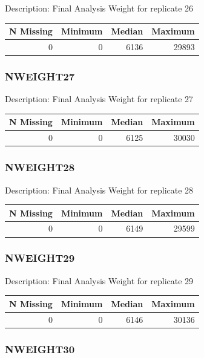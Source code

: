 \documentclass[
]{krantz}
\begin{document}
Description: Final Analysis Weight for replicate 26

\begin{tabular}[t]{r|r|r|r}
\hline
N Missing & Minimum & Median & Maximum\\
\hline
0 & 0 & 6136 & 29893\\
\hline
\end{tabular}

\hypertarget{nweight27}{%
\subsubsection*{NWEIGHT27}\label{nweight27}}


Description: Final Analysis Weight for replicate 27

\begin{tabular}[t]{r|r|r|r}
\hline
N Missing & Minimum & Median & Maximum\\
\hline
0 & 0 & 6125 & 30030\\
\hline
\end{tabular}

\hypertarget{nweight28}{%
\subsubsection*{NWEIGHT28}\label{nweight28}}


Description: Final Analysis Weight for replicate 28

\begin{tabular}[t]{r|r|r|r}
\hline
N Missing & Minimum & Median & Maximum\\
\hline
0 & 0 & 6149 & 29599\\
\hline
\end{tabular}

\hypertarget{nweight29}{%
\subsubsection*{NWEIGHT29}\label{nweight29}}


Description: Final Analysis Weight for replicate 29

\begin{tabular}[t]{r|r|r|r}
\hline
N Missing & Minimum & Median & Maximum\\
\hline
0 & 0 & 6146 & 30136\\
\hline
\end{tabular}

\hypertarget{nweight30}{%
\subsubsection*{NWEIGHT30}\label{nweight30}}
\end{document}
